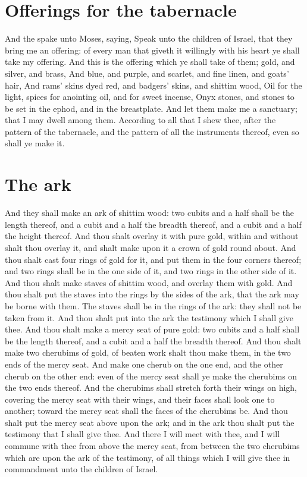 \section*{Offerings for the tabernacle}
\begin{biblechapter} %
\verse And the \LORD spake unto Moses, saying,
\verse Speak unto the children of Israel, that they bring me an offering: of every man that giveth it willingly with his heart ye shall take my offering.
\verse And this is the offering which ye shall take of them; gold, and silver, and brass,
\verse And blue, and purple, and scarlet, and fine linen, and goats' hair,
\verse And rams' skins dyed red, and badgers' skins, and shittim wood,
\verse Oil for the light, spices for anointing oil, and for sweet incense,
\verse Onyx stones, and stones to be set in the ephod, and in the breastplate.
\verse And let them make me a sanctuary; that I may dwell among them.
\verse According to all that I shew thee, after the pattern of the tabernacle, and the pattern of all the instruments thereof, even so shall ye make it.
\section*{The ark}
\verse And they shall make an ark of shittim wood: two cubits and a half shall be the length thereof, and a cubit and a half the breadth thereof, and a cubit and a half the height thereof.
\verse And thou shalt overlay it with pure gold, within and without shalt thou overlay it, and shalt make upon it a crown of gold round about.
\verse And thou shalt cast four rings of gold for it, and put them in the four corners thereof; and two rings shall be in the one side of it, and two rings in the other side of it.
\verse And thou shalt make staves of shittim wood, and overlay them with gold.
\verse And thou shalt put the staves into the rings by the sides of the ark, that the ark may be borne with them.
\verse The staves shall be in the rings of the ark: they shall not be taken from it.
\verse And thou shalt put into the ark the testimony which I shall give thee.
\verse And thou shalt make a mercy seat of pure gold: two cubits and a half shall be the length thereof, and a cubit and a half the breadth thereof.
\verse And thou shalt make two cherubims of gold, of beaten work shalt thou make them, in the two ends of the mercy seat.
\verse And make one cherub on the one end, and the other cherub on the other end: even of the mercy seat shall ye make the cherubims on the two ends thereof.
\verse And the cherubims shall stretch forth their wings on high, covering the mercy seat with their wings, and their faces shall look one to another; toward the mercy seat shall the faces of the cherubims be.
\verse And thou shalt put the mercy seat above upon the ark; and in the ark thou shalt put the testimony that I shall give thee.
\verse And there I will meet with thee, and I will commune with thee from above the mercy seat, from between the two cherubims which are upon the ark of the testimony, of all things which I will give thee in commandment unto the children of Israel.

\end{biblechapter}
